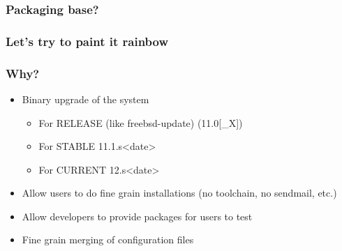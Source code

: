 \begin{frame}
	\frametitle{Packaging base?}
	\pause
	\colorbox{red}{\makebox[\textwidth]{\textcolor{white}{Do not split}}}
	\pause
	\colorbox{orange}{}
	\pause
	\colorbox{yellow}{}
	\pause
	\colorbox{green}{}
	\pause
	\colorbox{blue}{\makebox[\textwidth]{\textcolor{white}{No development file}}}
	\pause
	\colorbox{indigo!75}{\makebox[\textwidth]{\textcolor{white}{No documentation}}}
	\pause
	\colorbox{violet}{\makebox[\textwidth]{\textcolor{white}{I want debug files}}}
\end{frame}

\begin{frame}
	\frametitle{Let's try to paint it rainbow}
	\colorbox{red}{\makebox[\textwidth]{\textcolor{white}{FreeBSD FreeBSD-base FreeBSD-kernel FreeBSD-docs}}}
	\pause
	\colorbox{orange}{}
	\pause
	\colorbox{yellow}{}
	\pause
	\colorbox{green}{}
	\pause
	\colorbox{blue}{\makebox[\textwidth]{\textcolor{white}{runtime separated from development files}}}
	\pause
	\colorbox{indigo!75}{\makebox[\textwidth]{\textcolor{white}{FreeBSD-docs (does not concern manpages)}}}
	\pause
	\colorbox{violet}{\makebox[\textwidth]{\textcolor{white}{-debug packages}}}
\end{frame}

\begin{frame}
	\frametitle{Why?}
	\begin{itemize}
		\item Binary upgrade of the system
			\begin{itemize}
				\item For RELEASE (like freebsd-update) (11.0[\_X])
				\item For STABLE 11.1.s<date>
				\item For CURRENT 12.s<date>
			\end{itemize}
		\item Allow users to do fine grain installations (no toolchain, no sendmail, etc.)
		\item Allow developers to provide packages for users to test
		\item Fine grain merging of configuration files
	\end{itemize}
\end{frame}

